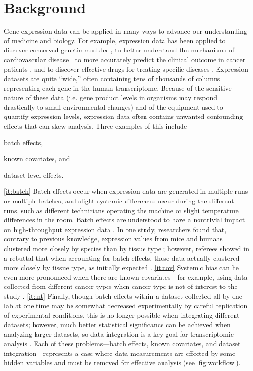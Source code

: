 \documentclass[12pt]{article}
\begin{document}
\section{Background} \label{sec:background}

Gene expression data can be applied in many ways to advance our understanding of medicine and biology.
For example, expression data has been applied to discover conserved genetic modules \citep{stuart_gene-coexpression_2003}, to better understand the mechanisms of cardiovascular disease \citep{henriksen_application_2002}, to more accurately predict the clinical outcome in cancer patients \citep{veer_gene_2002}, and to discover effective drugs for treating specific diseases \citep{sirota_discovery_2011}.
Expression datasets are quite ``wide,'' often containing tens of thousands of columns representing each gene in the human transcriptome.
Because of the sensitive nature of these data (i.e. gene product levels in organisms may respond drastically to small environmental changes) and of the equipment used to quantify expression levels, expression data often contains unwanted confounding effects that can skew analysis.
Three examples of this include
\begin{enumerate*}[(a)]
	\item batch effects, \label{it:batch}
	\item known covariates, and \label{it:cov}
	\item dataset-level effects. \label{it:int}
\end{enumerate*}
\ref{it:batch} Batch effects occur when expression data are generated in multiple runs or multiple batches, and slight systemic differences occur during the different runs, such as different technicians operating the machine or slight temperature differences in the room.
Batch effects are understood to have a nontrivial impact on high-throughput expression data \citep{leek_tackling_2010}.
In one study, researchers found that, contrary to previous knowledge, expression values from mice and humans clustered more closely by species than by tissue type \citep{yue_comparative_2014};
however, referees showed in a rebuttal that when accounting for batch effects, these data actually clustered more closely by tissue type, as initially expected \citep{gilad_reanalysis_2015}.
\ref{it:cov} Systemic bias can be even more pronounced when there are known covariates---for example, using data collected from different cancer types when cancer type is not of interest to the study \citep{dayton_classifying_2017-1}.
\ref{it:int} Finally, though batch effects within a dataset collected all by one lab at one time may be somewhat decreased experimentally by careful replication of experimental conditions, this is no longer possible when integrating different datasets;
however, much better statistical significance can be achieved when analyzing larger datasets, so data integration is a key goal for transcriptomic analysis  \citep{lazar_batch_2013}.
Each of these problems---batch effects, known covariates, and dataset integration---represents a case where data measurements are effected by some hidden variables and must be removed for effective analysis (see \figurename{} \ref{fig:workflow}).
\end{document}
